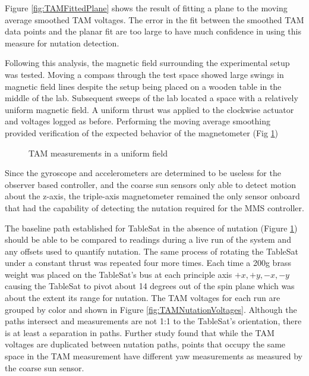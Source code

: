 Figure \ref{fig:TAMFittedPlane} shows the result of fitting a plane to the moving average smoothed TAM voltages.  The error in the fit between the smoothed TAM data points and the planar fit are too large to have much confidence in using this measure for nutation detection.

Following this analysis, the magnetic field surrounding the experimental setup was tested.  Moving a compass through the test space showed large swings in magnetic field lines despite the setup being placed on a wooden table in the middle of the lab.  Subsequent sweeps of the lab located a space with a relatively uniform magnetic field.  A uniform thrust was applied to the clockwise actuator and voltages logged as before.  Performing the moving average smoothing provided verification of the expected behavior of the magnetometer (Fig \ref{fig:TAMUniformField})

\begin{figure}[H]
  \centerline{}
  \caption{TAM measurements in a uniform field}
  \label{fig:TAMUniformField}
\end{figure}

Since the gyroscope and accelerometers are determined to be useless for the observer based controller, and the coarse sun sensors only able to detect motion about the z-axis, the triple-axis magnetometer remained the only sensor onboard that had the capability of detecting the nutation required for the MMS controller.

The baseline path established for TableSat in the absence of nutation (Figure \ref{fig:TAMUniformField}) should be able to be compared to readings during a live run of the system and any offsets used to quantify nutation.  The same process of rotating the TableSat under a constant thrust was repeated four more times.  Each time a 200g brass weight was placed on the TableSat's bus at each principle axis $+x, +y, -x, -y$ causing the TableSat to pivot about 14 degrees out of the spin plane which was about the extent its range for nutation.  The TAM voltages for each run are grouped by color and shown in Figure \ref{fig:TAMNutationVoltages}.  Although the paths intersect and measurements are not 1:1 to the TableSat's orientation, there is at least a separation in paths.  Further study found that while the TAM voltages are duplicated between nutation paths, points that occupy the same space in the TAM measurement have different yaw measurements as measured by the coarse sun sensor.

